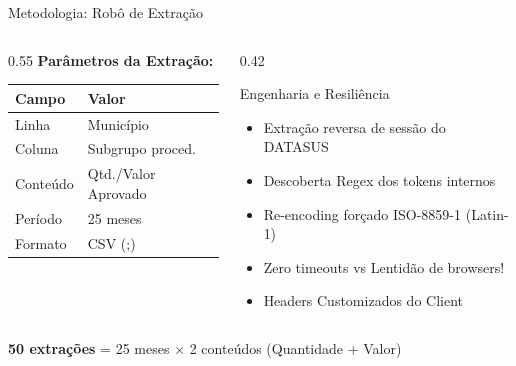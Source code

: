 \documentclass[aspectratio=169,10pt]{beamer}
\begin{document}
\begin{frame}{Metodologia: Robô de Extração}

\begin{columns}[T]
\begin{column}{0.55\textwidth}
    \textbf{Parâmetros da Extração:}
    \vspace{0.2cm}
    \begin{tabular}{ll}
    \toprule
    \textbf{Campo} & \textbf{Valor} \\
    \midrule
    Linha & Município \\
    Coluna & Subgrupo proced. \\
    Conteúdo & Qtd./Valor Aprovado \\
    Período & 25 meses \\
    Formato & CSV (;) \\
    \bottomrule
    \end{tabular}
\end{column}
\begin{column}{0.42\textwidth}
    \begin{block}{Engenharia e Resiliência}
    \begin{itemize}
        \item[\faRedo] Extração reversa de sessão do DATASUS
        \item[\faKey] Descoberta Regex dos tokens internos
        \item[\faShieldAlt] Re-encoding forçado ISO-8859-1 (Latin-1)
        \item[\faBolt] Zero timeouts vs Lentidão de browsers!
        \item[\faFileAlt] Headers Customizados do Client
    \end{itemize}
    \end{block}
\end{column}
\end{columns}

\vspace{0.3cm}
\begin{center}
\textbf{50 extrações} = 25 meses $\times$ 2 conteúdos (Quantidade + Valor)
\end{center}

\end{frame}
\end{document}
